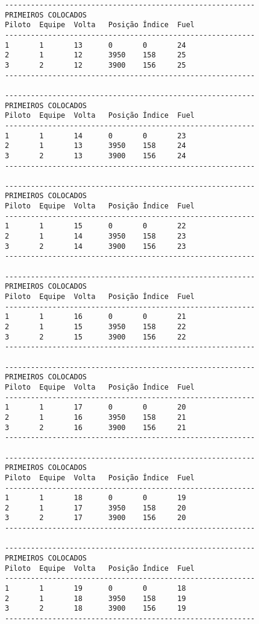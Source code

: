 \documentclass[12pt]{article}
\begin{document}
\begin{verbatim}
----------------------------------------------------------
PRIMEIROS COLOCADOS
Piloto  Equipe  Volta   Posição Índice  Fuel
----------------------------------------------------------
1       1       13      0       0       24
2       1       12      3950    158     25
3       2       12      3900    156     25
----------------------------------------------------------

----------------------------------------------------------
PRIMEIROS COLOCADOS
Piloto  Equipe  Volta   Posição Índice  Fuel
----------------------------------------------------------
1       1       14      0       0       23
2       1       13      3950    158     24
3       2       13      3900    156     24
----------------------------------------------------------

----------------------------------------------------------
PRIMEIROS COLOCADOS
Piloto  Equipe  Volta   Posição Índice  Fuel
----------------------------------------------------------
1       1       15      0       0       22
2       1       14      3950    158     23
3       2       14      3900    156     23
----------------------------------------------------------

----------------------------------------------------------
PRIMEIROS COLOCADOS
Piloto  Equipe  Volta   Posição Índice  Fuel
----------------------------------------------------------
1       1       16      0       0       21
2       1       15      3950    158     22
3       2       15      3900    156     22
----------------------------------------------------------

----------------------------------------------------------
PRIMEIROS COLOCADOS
Piloto  Equipe  Volta   Posição Índice  Fuel
----------------------------------------------------------
1       1       17      0       0       20
2       1       16      3950    158     21
3       2       16      3900    156     21
----------------------------------------------------------

----------------------------------------------------------
PRIMEIROS COLOCADOS
Piloto  Equipe  Volta   Posição Índice  Fuel
----------------------------------------------------------
1       1       18      0       0       19
2       1       17      3950    158     20
3       2       17      3900    156     20
----------------------------------------------------------

----------------------------------------------------------
PRIMEIROS COLOCADOS
Piloto  Equipe  Volta   Posição Índice  Fuel
----------------------------------------------------------
1       1       19      0       0       18
2       1       18      3950    158     19
3       2       18      3900    156     19
----------------------------------------------------------


\end{verbatim}
\end{document}
